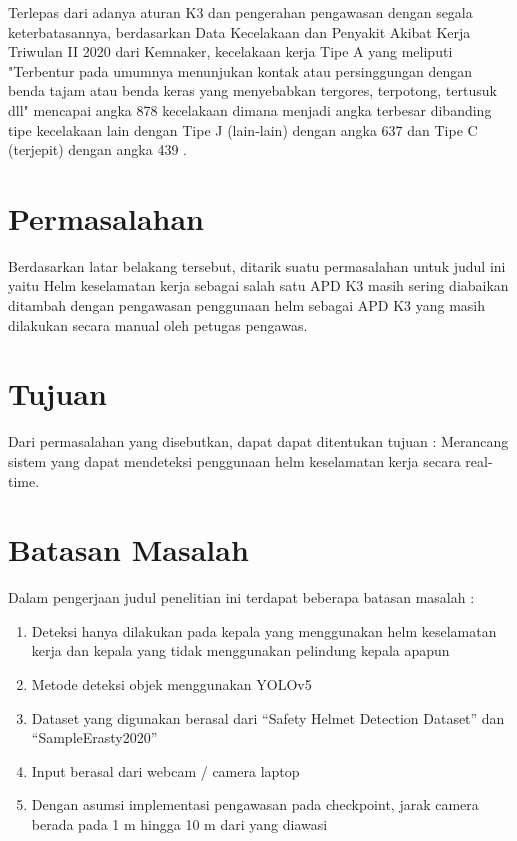 Terlepas dari adanya aturan K3 dan pengerahan pengawasan dengan segala keterbatasannya, berdasarkan Data Kecelakaan dan Penyakit Akibat Kerja Triwulan II 2020 dari Kemnaker, kecelakaan kerja Tipe A yang meliputi "Terbentur pada umumnya menunjukan kontak atau persinggungan dengan benda tajam atau benda keras yang menyebabkan tergores, terpotong, tertusuk dll" mencapai angka 878 kecelakaan dimana menjadi angka terbesar dibanding tipe kecelakaan lain dengan Tipe J (lain-lain) dengan angka 637 dan Tipe C (terjepit) dengan angka 439 \cite{satudata_kecelakaan_kerja}.


\section{Permasalahan}
\label{sec:permasalahan}

Berdasarkan latar belakang tersebut, ditarik suatu permasalahan untuk judul ini yaitu Helm keselamatan kerja sebagai salah satu APD K3 masih sering diabaikan ditambah dengan pengawasan penggunaan helm sebagai APD K3 yang masih dilakukan secara manual oleh petugas pengawas.


\section{Tujuan}
\label{sec:Tujuan}


Dari permasalahan yang disebutkan, dapat dapat ditentukan tujuan : Merancang sistem yang dapat mendeteksi penggunaan helm keselamatan kerja secara real-time.

\section{Batasan Masalah}
\label{sec:batasanmasalah}

Dalam pengerjaan judul penelitian ini terdapat beberapa batasan masalah :

\begin{enumerate}[nolistsep]
    \item Deteksi hanya dilakukan pada kepala yang menggunakan helm keselamatan kerja dan kepala yang tidak menggunakan pelindung kepala apapun
    \item Metode deteksi objek menggunakan YOLOv5
    \item Dataset yang digunakan berasal dari “Safety Helmet Detection Dataset” dan “SampleErasty2020”
    \item Input berasal dari webcam / camera laptop
    \item Dengan asumsi implementasi pengawasan pada checkpoint, jarak camera berada pada 1 m hingga 10 m dari yang diawasi
\end{enumerate}

